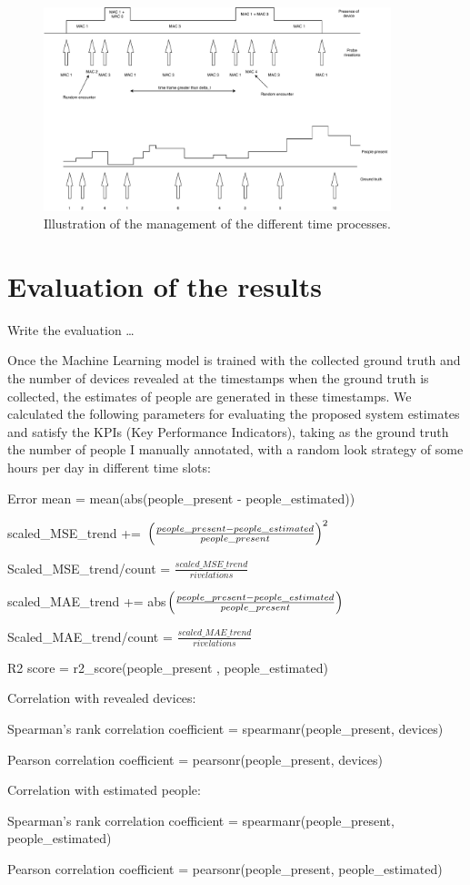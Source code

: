 \begin{figure}[h]
\centering 
\includegraphics[width=0.9\textwidth]{images/timeprocesses} 
\caption{Illustration of the management of the different time processes.}
\label{fig:timeprocesses}
\end{figure}


\section{Evaluation of the results}
\label{sec:evalres}
\vspace{0.2 cm} 

Write the evaluation \dots

Once the Machine Learning model is trained with the collected ground truth and the number of devices revealed at the timestamps when the ground truth is collected, the estimates of people are generated in these timestamps. We calculated the following parameters for evaluating the proposed system estimates and satisfy the KPIs (Key Performance Indicators), taking as the ground truth the number of people I manually annotated, with a random look strategy of some hours per day in different time slots:

Error mean = mean(abs(people\_present - people\_estimated))

scaled\_MSE\_trend += $\Bigl(\frac{people\_present - people\_estimated}{people\_present} \Bigr)^{2}$

Scaled\_MSE\_trend/count = $\frac{scaled\_MSE\_trend}{rivelations}$

scaled\_MAE\_trend += abs$\Bigl(\frac{people\_present - people\_estimated}{people\_present} \Bigr)$

Scaled\_MAE\_trend/count = $\frac{scaled\_MAE\_trend}{rivelations}$

R2 score = r2\_score(people\_present , people\_estimated)

Correlation with revealed devices:

Spearman's rank correlation coefficient = spearmanr(people\_present, devices)

Pearson correlation coefficient = pearsonr(people\_present, devices)

Correlation with estimated people:

Spearman's rank correlation coefficient = spearmanr(people\_present, people\_estimated)

Pearson correlation coefficient = pearsonr(people\_present, people\_estimated)
